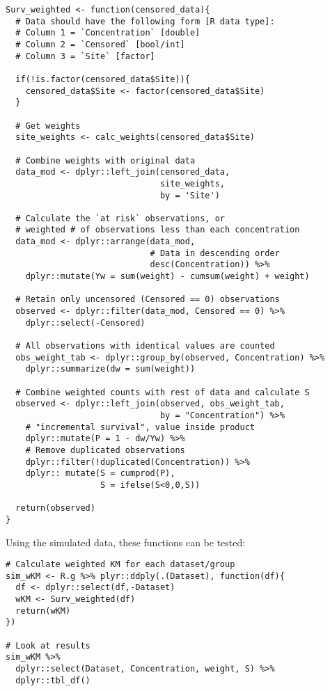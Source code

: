 \begin{snugshade}
\begin{verbatim}
Surv_weighted <- function(censored_data){
  # Data should have the following form [R data type]:
  # Column 1 = `Concentration` [double]
  # Column 2 = `Censored` [bool/int]
  # Column 3 = `Site` [factor]
  
  if(!is.factor(censored_data$Site)){
    censored_data$Site <- factor(censored_data$Site)
  }
  
  # Get weights
  site_weights <- calc_weights(censored_data$Site)
  
  # Combine weights with original data
  data_mod <- dplyr::left_join(censored_data,
                               site_weights,
                               by = 'Site')
  
  # Calculate the `at risk` observations, or
  # weighted # of observations less than each concentration
  data_mod <- dplyr::arrange(data_mod,
                             # Data in descending order
                             desc(Concentration)) %>%
    dplyr::mutate(Yw = sum(weight) - cumsum(weight) + weight)
  
  # Retain only uncensored (Censored == 0) observations
  observed <- dplyr::filter(data_mod, Censored == 0) %>%
    dplyr::select(-Censored)
  
  # All observations with identical values are counted
  obs_weight_tab <- dplyr::group_by(observed, Concentration) %>%
    dplyr::summarize(dw = sum(weight))
  
  # Combine weighted counts with rest of data and calculate S
  observed <- dplyr::left_join(observed, obs_weight_tab,
                               by = "Concentration") %>%
    # "incremental survival", value inside product
    dplyr::mutate(P = 1 - dw/Yw) %>%
    # Remove duplicated observations
    dplyr::filter(!duplicated(Concentration)) %>%
    dplyr:: mutate(S = cumprod(P),
                   S = ifelse(S<0,0,S))
  
  return(observed)
}
\end{verbatim}
\end{snugshade}

Using the simulated data, these functions can be tested:

\begin{snugshade}
\begin{verbatim}
# Calculate weighted KM for each dataset/group
sim_wKM <- R.g %>% plyr::ddply(.(Dataset), function(df){
  df <- dplyr::select(df,-Dataset)
  wKM <- Surv_weighted(df)
  return(wKM)
})

# Look at results
sim_wKM %>% 
  dplyr::select(Dataset, Concentration, weight, S) %>%
  dplyr::tbl_df()
\end{verbatim}
\end{snugshade}

